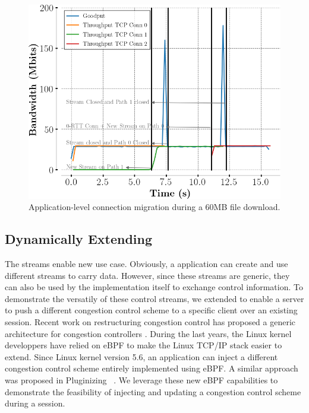\begin{figure}[!t]
  \centering
  \includegraphics[width=\columnwidth]{figures/migration.png}
  \caption{Application-level connection migration during a 60MB file download.}
  \label{fig:conn_migration}
\end{figure}



\subsection{Dynamically Extending \tcpls}

The \tcpls streams enable new use case. Obviously, a \tcpls application can
create and use different streams to carry data. However, since these streams
are generic, they can also be used by the \tcpls implementation itself to
exchange control information. To demonstrate the versatily of these control
streams, we extended \tcpls to enable a server to push a different congestion
control scheme to a specific client over an existing \tcpls session. Recent
work on restructuring congestion control has proposed a generic architecture
for congestion controllers \cite{narayan2018restructuring}.
During the last years, the Linux kernel developpers have relied on eBPF
to make the Linux TCP/IP stack \cite{brakmo2017tcp,tran2020beyond} easier
to extend. Since Linux kernel version 5.6, an application can inject
a different congestion control scheme entirely implemented using eBPF. A similar
approach was proposed in Pluginizing \quic~\cite{de2019pluginizing}.  We
leverage these new eBPF capabilities to demonstrate the feasibility of injecting
and updating a congestion control scheme during a \tcpls session.

